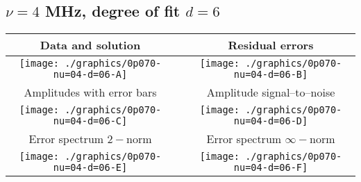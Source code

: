 

% 

\clearpage{}
\break{}

\subsection{$\nu = 4$ MHz, degree of fit $d = 6$}

\begin{table}[h]
    \begin{center}
        \begin{tabular}{ccc}
            Data and solution & \quad & Residual errors \\\hline
            \texttt{[image: ./graphics/0p070-nu=04-d=06-A]} &&
            \texttt{[image: ./graphics/0p070-nu=04-d=06-B]} \\[15pt]
            Amplitudes with error bars && Amplitude signal--to--noise \\\hline
            \texttt{[image: ./graphics/0p070-nu=04-d=06-C]} &&
            \texttt{[image: ./graphics/0p070-nu=04-d=06-D]} \\[15pt]
            Error spectrum $2-$norm && Error spectrum $\infty-$norm \\\hline
            \texttt{[image: ./graphics/0p070-nu=04-d=06-E]} &&
            \texttt{[image: ./graphics/0p070-nu=04-d=06-F]} \\[15pt]
        \end{tabular}
    \end{center}
\label{fig:elev=70, nu=4}
\end{table}



\endinput

